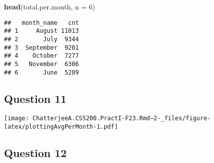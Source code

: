 \documentclass[
]{article}
\newenvironment{Shaded}{\begin{snugshade}}{\end{snugshade}}
\newcommand{\AttributeTok}[1]{\textcolor[rgb]{0.13,0.29,0.53}{#1}}
\newcommand{\DecValTok}[1]{\textcolor[rgb]{0.00,0.00,0.81}{#1}}
\newcommand{\FunctionTok}[1]{\textcolor[rgb]{0.13,0.29,0.53}{\textbf{#1}}}
\newcommand{\NormalTok}[1]{#1}
\newcommand{\OtherTok}[1]{\textcolor[rgb]{0.56,0.35,0.01}{#1}}
\newcommand{\SpecialCharTok}[1]{\textcolor[rgb]{0.81,0.36,0.00}{\textbf{#1}}}
\newcommand{\StringTok}[1]{\textcolor[rgb]{0.31,0.60,0.02}{#1}}
\begin{document}
\begin{Shaded}
\begin{Highlighting}[]
\FunctionTok{head}\NormalTok{(total.per.month, }\AttributeTok{n =} \DecValTok{6}\NormalTok{)}
\end{Highlighting}
\end{Shaded}

\begin{verbatim}
##   month_name   cnt
## 1     August 11013
## 2       July  9344
## 3  September  9201
## 4    October  7277
## 5   November  6306
## 6       June  5209
\end{verbatim}

\hypertarget{question-11}{%
\subsection{Question 11}\label{question-11}}

\begin{Shaded}
\end{Shaded}

\texttt{[image: ChatterjeeA.CS5200.PractI-F23.Rmd--2-\_files/figure-latex/plottingAvgPerMonth-1.pdf]}

\hypertarget{question-12}{%
\subsection{Question 12}\label{question-12}}
\end{document}
